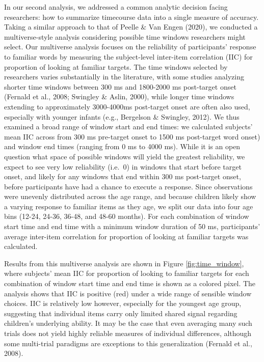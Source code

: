 \documentclass[10pt, letterpaper]{article}
\begin{document}
In our second analysis, we addressed a common analytic decision facing
researchers: how to summarize timecourse data into a single measure of
accuracy. Taking a similar approach to that of Peelle \& Van Engen
(2020), we conducted a multiverse-style analysis considering possible
time windows researchers might select. Our multiverse analysis focuses
on the reliability of participants' response to familiar words by
measuring the subject-level inter-item correlation (IIC) for proportion
of looking at familiar targets. The time windows selected by researchers
varies substantially in the literature, with some studies analyzing
shorter time windows between 300 ms and 1800-2000 ms post-target onset
(Fernald et al., 2008; Swingley \& Aslin, 2000), while longer time
windows extending to approximately 3000-4000ms post-target onset are
often also used, especially with younger infants (e.g., Bergelson \&
Swingley, 2012). We thus examined a broad range of window start and end
times: we calculated subjects' mean IIC across from 300 ms pre-target
onset to 1500 ms post-target word onset) and window end times (ranging
from 0 ms to 4000 ms). While it is an open question what space of
possible windows will yield the greatest reliability, we expect to see
very low reliability (i.e.~0) in windows that start before target onset,
and likely for any windows that end within 300 ms post-target onset,
before participants have had a chance to execute a response. Since
observations were unevenly distributed across the age range, and because
children likely show a varying response to familiar items as they age,
we split our data into four age bins (12-24, 24-36, 36-48, and 48-60
months). For each combination of window start time and end time with a
minimum window duration of 50 ms, participants' average inter-item
correlation for proportion of looking at familiar targets was
calculated.

Results from this multiverse analysis are shown in Figure
\ref{fig:time_window}, where subjects' mean IIC for proportion of
looking to familiar targets for each combination of window start time
and end time is shown as a colored pixel. The analysis shows that IIC is
positive (red) under a wide range of sensible window choices. IIC is
relatively low however, especially for the youngest age group,
suggesting that individual items carry only limited shared signal
regarding children's underlying ability. It may be the case that even
averaging many such trials does not yield highly reliable measures of
individual differences, although some multi-trial paradigms are
exceptions to this generalization (Fernald et al., 2008).
\end{document}
